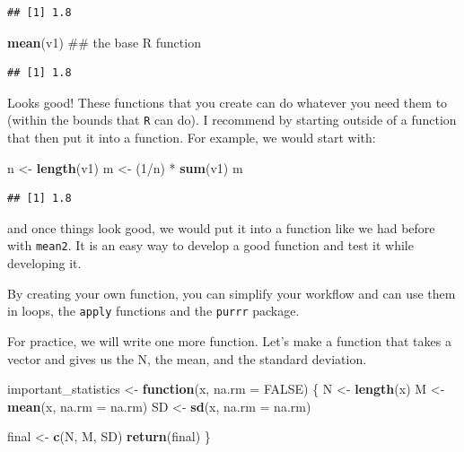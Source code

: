 \documentclass[]{tufte-book}
\newenvironment{Shaded}{}{}
\newcommand{\KeywordTok}[1]{\textcolor[rgb]{0.00,0.44,0.13}{\textbf{#1}}}
\newcommand{\DataTypeTok}[1]{\textcolor[rgb]{0.56,0.13,0.00}{#1}}
\newcommand{\DecValTok}[1]{\textcolor[rgb]{0.25,0.63,0.44}{#1}}
\newcommand{\StringTok}[1]{\textcolor[rgb]{0.25,0.44,0.63}{#1}}
\newcommand{\OtherTok}[1]{\textcolor[rgb]{0.00,0.44,0.13}{#1}}
\newcommand{\ControlFlowTok}[1]{\textcolor[rgb]{0.00,0.44,0.13}{\textbf{#1}}}
\newcommand{\OperatorTok}[1]{\textcolor[rgb]{0.40,0.40,0.40}{#1}}
\newcommand{\NormalTok}[1]{#1}
\theoremstyle{definition}
\theoremstyle{definition}
\theoremstyle{remark}
\begin{document}
\begin{verbatim}
## [1] 1.8
\end{verbatim}

\begin{Shaded}
\begin{Highlighting}[]
\KeywordTok{mean}\NormalTok{(v1)  ## the base R function}
\end{Highlighting}
\end{Shaded}

\begin{verbatim}
## [1] 1.8
\end{verbatim}

Looks good! These functions that you create can do whatever you need
them to (within the bounds that \texttt{R} can do). I recommend by
starting outside of a function that then put it into a function. For
example, we would start with:

\begin{Shaded}
\begin{Highlighting}[]
\NormalTok{n <-}\StringTok{ }\KeywordTok{length}\NormalTok{(v1)}
\NormalTok{m <-}\StringTok{ }\NormalTok{(}\DecValTok{1}\OperatorTok{/}\NormalTok{n) }\OperatorTok{*}\StringTok{ }\KeywordTok{sum}\NormalTok{(v1)}
\NormalTok{m}
\end{Highlighting}
\end{Shaded}

\begin{verbatim}
## [1] 1.8
\end{verbatim}

and once things look good, we would put it into a function like we had
before with \texttt{mean2}. It is an easy way to develop a good function
and test it while developing it.

By creating your own function, you can simplify your workflow and can
use them in loops, the \texttt{apply} functions and the \texttt{purrr}
package.

For practice, we will write one more function. Let's make a function
that takes a vector and gives us the N, the mean, and the standard
deviation.

\begin{Shaded}
\begin{Highlighting}[]
\NormalTok{important_statistics <-}\StringTok{ }\ControlFlowTok{function}\NormalTok{(x, }\DataTypeTok{na.rm =} \OtherTok{FALSE}\NormalTok{) \{}
\NormalTok{    N <-}\StringTok{ }\KeywordTok{length}\NormalTok{(x)}
\NormalTok{    M <-}\StringTok{ }\KeywordTok{mean}\NormalTok{(x, }\DataTypeTok{na.rm =}\NormalTok{ na.rm)}
\NormalTok{    SD <-}\StringTok{ }\KeywordTok{sd}\NormalTok{(x, }\DataTypeTok{na.rm =}\NormalTok{ na.rm)}
    
\NormalTok{    final <-}\StringTok{ }\KeywordTok{c}\NormalTok{(N, M, SD)}
    \KeywordTok{return}\NormalTok{(final)}
\NormalTok{\}}
\end{Highlighting}
\end{Shaded}
\end{document}
